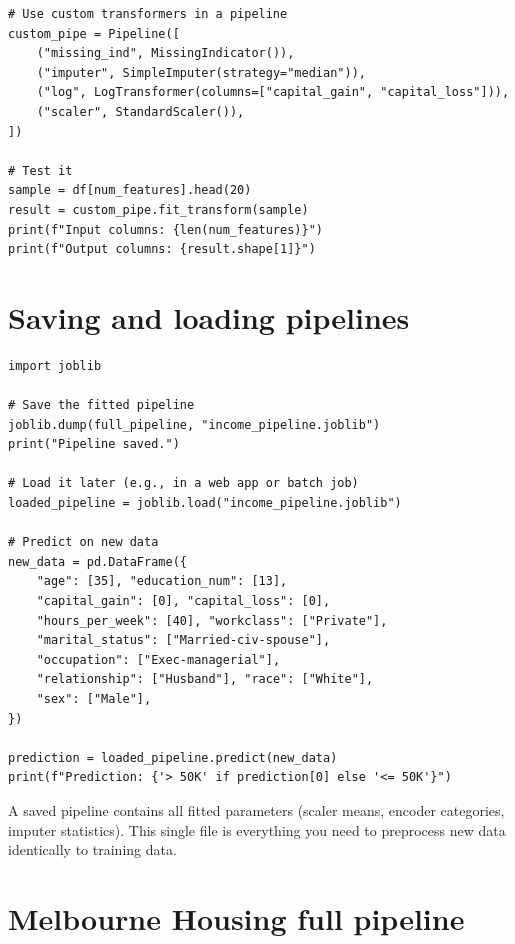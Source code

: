 \begin{verbatim}
# Use custom transformers in a pipeline
custom_pipe = Pipeline([
    ("missing_ind", MissingIndicator()),
    ("imputer", SimpleImputer(strategy="median")),
    ("log", LogTransformer(columns=["capital_gain", "capital_loss"])),
    ("scaler", StandardScaler()),
])

# Test it
sample = df[num_features].head(20)
result = custom_pipe.fit_transform(sample)
print(f"Input columns: {len(num_features)}")
print(f"Output columns: {result.shape[1]}")
\end{verbatim}

\section{Saving and loading pipelines}

\begin{verbatim}
import joblib

# Save the fitted pipeline
joblib.dump(full_pipeline, "income_pipeline.joblib")
print("Pipeline saved.")

# Load it later (e.g., in a web app or batch job)
loaded_pipeline = joblib.load("income_pipeline.joblib")

# Predict on new data
new_data = pd.DataFrame({
    "age": [35], "education_num": [13],
    "capital_gain": [0], "capital_loss": [0],
    "hours_per_week": [40], "workclass": ["Private"],
    "marital_status": ["Married-civ-spouse"],
    "occupation": ["Exec-managerial"],
    "relationship": ["Husband"], "race": ["White"],
    "sex": ["Male"],
})

prediction = loaded_pipeline.predict(new_data)
print(f"Prediction: {'> 50K' if prediction[0] else '<= 50K'}")
\end{verbatim}

\begin{preprocesstip}
A saved pipeline contains all fitted parameters (scaler means, encoder categories, imputer statistics). This single file is everything you need to preprocess new data identically to training data.
\end{preprocesstip}

\section{Melbourne Housing full pipeline}

